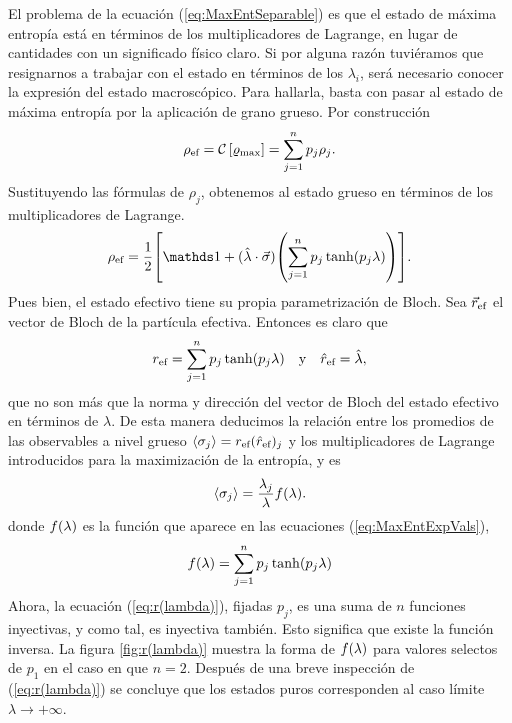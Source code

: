 El problema de la ecuación (\ref{eq:MaxEntSeparable}) es que el estado de máxima entropía está en términos de los multiplicadores de Lagrange, en lugar de cantidades con un significado físico claro. Si por alguna razón tuviéramos que resignarnos a trabajar con el estado en términos de los $\lambda_{i}$, será necesario conocer la expresión del estado macroscópico. Para hallarla, basta con pasar al estado de máxima entropía por la aplicación de grano grueso. Por construcción 
\begin{equation}
    \rho_{\text{ef}}=\mathcal{C}\left[\varrho_{\max}\right]=\sum_{j=1}^{n}p_{j}\rho_{j}.\nonumber
\end{equation}
Sustituyendo las fórmulas de $\rho_{j}$, obtenemos al estado grueso en términos de los multiplicadores de Lagrange.
\begin{equation}\label{eq:CG(MaxEnt)}
    \rho_{\ef}=\frac{1}{2}\qty[\Id+(\paulivec{\lambda})\qty(\sum_{j=1}^{n}p_{j}\tanh(p_{j}\lambda))].
\end{equation}
Pues bien, el estado efectivo tiene su propia parametrización de Bloch. Sea $\vec{r}_{\text{ef}}$ el vector de Bloch de la partícula efectiva. Entonces es claro que
\begin{align}
    r_{\text{ef}}=\sum_{j=1}^{n}p_{j}\tanh(p_{j}\lambda) && \text{y} && \hat{r}_{\text{ef}}=\hat{\lambda},\nonumber
\end{align}
que no son más que la norma y dirección del vector de Bloch del estado efectivo en términos de $\lambda$. De esta manera deducimos la relación entre los promedios de las observables a nivel grueso $\expval{\sigma_{j}}=r_{\text{ef}}(\hat{r}_{\text{ef}})_{j}$ y los multiplicadores de Lagrange introducidos para la maximización de la entropía, y es
\begin{equation}
    \expval{\sigma_{j}}=\frac{\lambda_{j}}{\lambda}f(\lambda).
\end{equation}
donde $f(\lambda)$ es la función que aparece en las ecuaciones (\ref{eq:MaxEntExpVals}),
\begin{equation}\label{eq:r(lambda)}
    f(\lambda)=\sum_{j=1}^{n}p_{j}\tanh(p_{j}\lambda)
\end{equation}
Ahora, la ecuación (\ref{eq:r(lambda)}), fijadas $p_{j}$, es una suma de $n$ funciones inyectivas, y como tal, es inyectiva también. Esto significa que existe la función inversa. La figura \ref{fig:r(lambda)} muestra la forma de $f(\lambda)$ para valores selectos de $p_{1}$ en el caso en que $n=2$. Después de una breve inspección de (\ref{eq:r(lambda)}) se concluye que los estados puros corresponden al caso límite $\lambda\rightarrow+\infty$.
